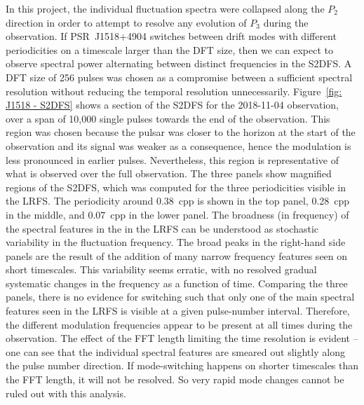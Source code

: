 In this project, the individual fluctuation spectra were collapsed along the $P_2$ direction in order to attempt to resolve any evolution of $P_3$ during the observation. If PSR~J1518+4904 switches between drift modes with different periodicities on a timescale larger than the DFT size, then we can expect to observe spectral power alternating between distinct frequencies in the S2DFS. A DFT size of 256 pulses was chosen as a compromise between a sufficient spectral resolution without reducing the temporal resolution unnecessarily. Figure~\ref{fig: J1518 - S2DFS} shows a section of the S2DFS for the 2018-11-04 observation, over a span of 10,000 single pulses towards the end of the observation. This region was chosen because the pulsar was closer to the horizon at the start of the observation and its signal was weaker as a consequence, hence the modulation is less pronounced in earlier pulses. Nevertheless, this region is representative of what is observed over the full observation. The three panels show magnified regions of the S2DFS, which was computed for the three periodicities visible in the LRFS. The periodicity around 0.38~cpp is shown in the top panel, 0.28~cpp in the middle, and 0.07~cpp in the lower panel. The broadness (in frequency) of the spectral features in the in the LRFS can be understood as stochastic variability in the fluctuation frequency. The broad peaks in the right-hand side panels are the result of the addition of many narrow frequency features seen on short timescales. This variability seems erratic, with no resolved gradual systematic changes in the frequency as a function of time. Comparing the three panels, there is no evidence for switching such that only one of the main spectral features seen in the LRFS is visible at a given pulse-number interval. Therefore, the different modulation frequencies appear to be present at all times during the observation. The effect of the FFT length limiting the time resolution is evident -- one can see that the individual spectral features are smeared out slightly along the pulse number direction. If mode-switching happens on shorter timescales than the FFT length, it will not be resolved. So very rapid mode changes cannot be ruled out with this analysis.

